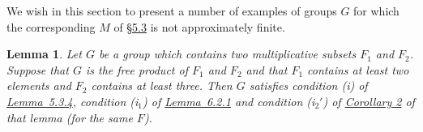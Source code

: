 \documentclass[b5paper,twoside]{article}
\newcommand{\secref}[2]{\hyperref[#1]{\mbox{\S#2}}}
\newcommand{\lemref}[2]{\hyperref[#1]{\mbox{Lemma~#2}}}
\theoremstyle{mvnplain}
\newtheorem{lemma}{Lemma}[section]
\newcommand{\M}{\mathbf M}
\def\M{M}%
\def\mathfrak#1{#1}%
\begin{document}
We wish in this section to present a number of examples of groups $\mathfrak G$
for which the corresponding $\M$ of \secref{sec:5.3}{5.3} is not
approximately finite.

\begin{lemma}\label{lem:6.3.1}
Let $\mathfrak G$ be a group which contains two multiplicative subsets
$\mathfrak F_1$ and $\mathfrak F_2$. Suppose that $\mathfrak G$ is the free
product of $\mathfrak F_1$ and $\mathfrak F_2$ and that $\mathfrak F_1$
contains at least two elements and $\mathfrak F_2$ contains at least three.
Then $\mathfrak G$ satisfies condition (i) of \lemref{lem:5.3.4}{5.3.4},
condition (i$_1$) of \lemref{lem:6.2.1}{6.2.1} and condition (i$_2'$) of
\hyperref[cor:6.2.2]{Corollary 2} of that lemma (for the same $\mathfrak F$).
\end{lemma}
\end{document}
